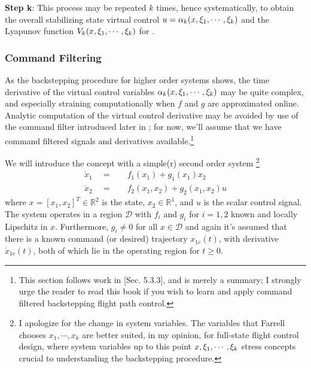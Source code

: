 \documentclass[12pt]{ucthesis}
\begin{document}
\noindent \textbf{Step k}: This process may be repeated $k$ times, hence systematically, to obtain the overall stabilizing state virtual control $u = \alpha_k(x,\xi_1,\cdots,\xi_k)$ and the Lyapunov function $V_k(x,\xi_1,\cdots,\xi_k)$ for .

\subsubsection{Command Filtering}
\label{subsub: cfbs}
As the backstepping procedure for higher order systems shows, the time derivative of the virtual control variables $\alpha_k(x,\xi_1,\cdots,\xi_k)$ may be quite complex, and especially straining computationally when $f$ and $g$ are approximated online. Analytic computation of the virtual control derivative may be avoided by use of the command filter introduced later in ; for now, we'll assume that we have command filtered signals and derivatives available.\footnote{This section follows work in \citet{Farrell2006}[Sec. 5.3.3], and is merely a summary; I strongly urge the reader to read this book if you wish to learn and apply command filtered backstepping flight path control.}

We will introduce the concept with a simple(r) second order system \footnote{I apologize for the change in system variables. The variables that Farrell chooses $x_1,\cdots,x_k$ are better suited, in my opinion, for full-state flight control design, where system variables up to this point $x,\xi_1,\cdots,\xi_k$ stress concepts crucial to understanding the backstepping procedure.}
	\begin{subequations} \label{eq: cf_sys}
		\begin{align}
			\label{eq: cf_sysa} \dot{x}_1 	\quad =& \quad f_1(x_1) + g_1(x_1)x_2 		\\
			\label{eq: cf_sysb} \dot{x}_2	\quad =& \quad f_2(x_1,x_2) + g_2(x_1,x_2)u
		\end{align}
	\end{subequations}
where $x = [x_1,x_2]^T \in \mathbb{R}^2$ is the state, $x_2 \in \mathbb{R}^1$, and $u$ is the scalar control signal. The system operates in a region $\mathcal{D}$ with $f_i$ and $g_i$ for $i = 1,2$ known and locally Lipschitz in $x$. Furthermore, $g_i \neq 0$ for all $x \in \mathcal{D}$ and again it's assumed that there is a known command (or desired) trajectory $x_{1c}(t)$, with derivative $\dot{x}_{1c}(t)$, both of which lie in the operating region for $t \geq 0$. 
\end{document}
